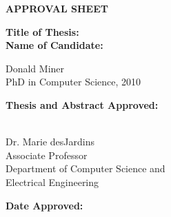 \newpage
\begin{titlepage}
\vspace{0.6in}
\begin{singlespace}

\begin{center}
\vspace{0.1in}
\large{\bf APPROVAL SHEET}
\bigskip \bigskip
\end{center}

\begin{flushleft}
{\bf Title of Thesis:}{\hspace{3mm}}\thesistitle\\
\vspace{0.5in}
{\bf Name of Candidate:}{\hspace{3mm}} \parbox[t]{2in}{Donald Miner \\ PhD in Computer Science, 2010}
\end{flushleft}

\vspace{0.5in}

\begin{flushleft}
{\bf Thesis and Abstract Approved:}{\hspace{3mm}} 
\parbox[t]{2.5in}{\underline{\hspace{2.0in}}\\ 
	Dr. Marie desJardins\\
	Associate Professor \\
	Department of Computer Science and \\
	Electrical Engineering}
\end{flushleft}

\vspace{0.8in}

\begin{flushleft}
{\bf Date Approved:}{\hspace{3mm}} \underline{\hspace{2.5in}}\\
\end{flushleft}

\end{singlespace}
\end{titlepage}
\par\vfil
